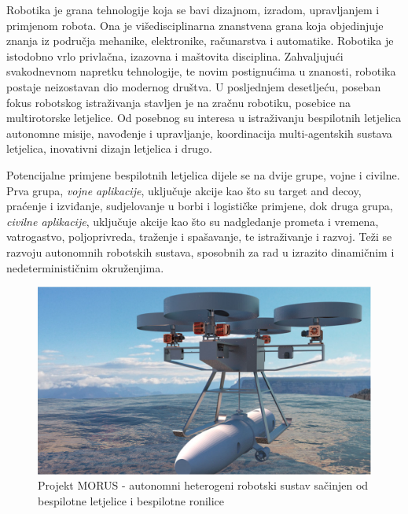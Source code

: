 \documentclass[11pt,a4paper]{article}
\begin{document}
Robotika je grana tehnologije koja se bavi dizajnom, izradom, upravljanjem i primjenom robota. Ona je višedisciplinarna znanstvena grana koja objedinjuje znanja iz područja mehanike, elektronike, računarstva i automatike. \cite{kova} Robotika je istodobno vrlo privlačna, izazovna i maštovita disciplina. Zahvaljujući svakodnevnom napretku tehnologije, te novim postignućima u znanosti, robotika postaje neizostavan dio modernog društva. U posljednjem desetljeću, poseban fokus robotskog istraživanja stavljen je na zračnu robotiku, posebice na multirotorske letjelice. Od posebnog su interesa u istraživanju bespilotnih letjelica autonomne misije, navođenje i upravljanje, koordinacija multi-agentskih sustava letjelica, inovativni dizajn letjelica i drugo. 

\medskip

Potencijalne primjene bespilotnih letjelica dijele se na dvije grupe, vojne i civilne. Prva grupa, \textit{vojne aplikacije}, uključuje akcije kao što su target and decoy, praćenje i izviđanje, sudjelovanje u borbi i logističke primjene, dok druga grupa, \textit{civilne aplikacije}, uključuje akcije kao što su nadgledanje prometa i vremena, vatrogastvo, poljoprivreda, traženje i spašavanje, te istraživanje i razvoj. \cite{urs} Teži se razvoju autonomnih robotskih sustava, sposobnih za rad u izrazito dinamičnim i nedeterminističnim okruženjima.

\medskip

\begin{figure}[H]
	\centering
	\includegraphics[scale=0.35]{koord}
	\caption{Projekt MORUS - autonomni heterogeni robotski sustav sačinjen od bespilotne letjelice i bespilotne ronilice \cite{haus2}}
	\label{fig:koord}
\end{figure}
\end{document}
